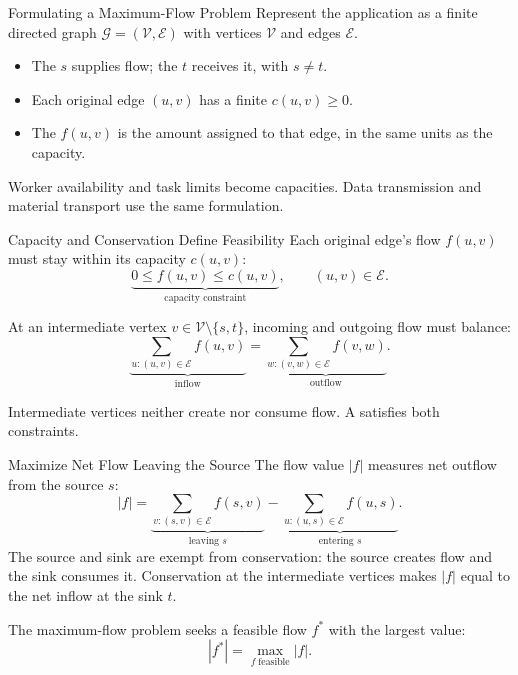 \documentclass[aspectratio=169,11pt]{beamer}
\begin{document}
\begin{frame}{Formulating a Maximum-Flow Problem}
  Represent the application as a finite directed graph
  $\mathcal G=(\mathcal V,\mathcal E)$ with vertices $\mathcal V$ and edges
  $\mathcal E$.

  \vspace{0.7em}
  \begin{itemize}\setlength{\itemsep}{0.7em}
    \item The  $s$ supplies flow; the  $t$ receives
      it, with $s\ne t$.
    \item Each original edge $(u,v)$ has a finite 
      $c(u,v)\geq0$.
    \item The  $f(u,v)$ is the amount assigned to that edge,
      in the same units as the capacity.
  \end{itemize}

  \vspace{0.5em}
  Worker availability and task limits become capacities. Data transmission
  and material transport use the same formulation.
\end{frame}

\begin{frame}{Capacity and Conservation Define Feasibility}
  Each original edge's flow $f(u,v)$ must stay within its capacity $c(u,v)$:
  \[
    \underbrace{0\leq f(u,v)\leq c(u,v)}_{\text{capacity constraint}},
    \qquad (u,v)\in\mathcal E.
  \]

  At an intermediate vertex $v\in\mathcal V\setminus\{s,t\}$, incoming
  and outgoing flow must balance:
  \[
    \underbrace{\sum_{u:(u,v)\in\mathcal E}f(u,v)}_{\text{inflow}}
    =\underbrace{\sum_{w:(v,w)\in\mathcal E}f(v,w)}_{\text{outflow}}.
  \]

  Intermediate vertices neither create nor consume flow. A
   satisfies both constraints.
\end{frame}

\begin{frame}{Maximize Net Flow Leaving the Source}
  The flow value $|f|$ measures net outflow from the source $s$:
  \[
    |f|=
    \underbrace{\sum_{v:(s,v)\in\mathcal E}f(s,v)}_{\text{leaving }s}
    -\underbrace{\sum_{u:(u,s)\in\mathcal E}f(u,s)}_{\text{entering }s}.
  \]
  The source and sink are exempt from conservation: the source creates flow
  and the sink consumes it. Conservation at the intermediate vertices makes
  $|f|$ equal to the net inflow at the sink $t$.

  \vspace{0.5em}
  The maximum-flow problem seeks a feasible flow $f^*$ with the largest value:
  \[
    |f^*|=\max_{f\;\text{feasible}}|f|.
  \]

\end{frame}
\end{document}
